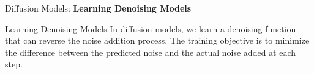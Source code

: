 \begin{frame}{}
    \LARGE Diffusion Models: \textbf{Learning Denoising Models}
\end{frame}


\begin{frame}[allowframebreaks]{Learning Denoising Models}
In diffusion models, we learn a denoising function that can reverse the noise addition process. The training objective is to minimize the difference between the predicted noise and the actual noise added at each step.

\end{frame}
